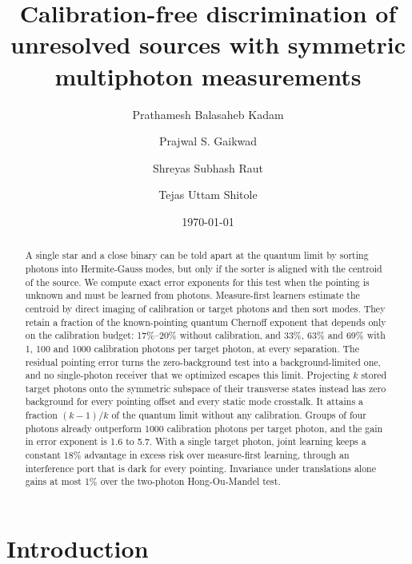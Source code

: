\documentclass[reprint,pra,aps,amsmath,amssymb,superscriptaddress,nofootinbib]{revtex4-2}
\begin{document}
\title{Calibration-free discrimination of unresolved sources with symmetric multiphoton measurements}

\author{Prathamesh Balasaheb Kadam}
\author{Prajwal S. Gaikwad}
\author{Shreyas Subhash Raut}
\author{Tejas Uttam Shitole}

\date{\today}

\begin{abstract}
A single star and a close binary can be told apart at the quantum limit by sorting photons into Hermite-Gauss
modes, but only if the sorter is aligned with the centroid of the source. We compute exact error exponents for
this test when the pointing is unknown and must be learned from photons. Measure-first learners estimate the
centroid by direct imaging of calibration or target photons and then sort modes. They retain a fraction of the
known-pointing quantum Chernoff exponent that depends only on the calibration budget: 17\%--20\% without
calibration, and 33\%, 63\% and 69\% with 1, 100 and 1000 calibration photons per target photon, at every
separation. The residual pointing error turns the zero-background test into a background-limited one, and no
single-photon receiver that we optimized escapes this limit. Projecting $k$ stored target photons onto the
symmetric subspace of their transverse states instead has zero background for every pointing offset and every
static mode crosstalk. It attains a fraction $(k-1)/k$ of the quantum limit without any calibration. Groups of four
photons already outperform 1000 calibration photons per target photon, and the gain in error exponent is 1.6 to
5.7. With a single target photon, joint learning keeps a constant 18\% advantage in excess risk over measure-first
learning, through an interference port that is dark for every pointing. Invariance under translations alone gains
at most 1\% over the two-photon Hong-Ou-Mandel test.
\end{abstract}

\maketitle

\section{Introduction}
\end{document}
